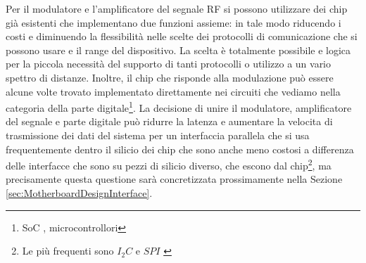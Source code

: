 \documentclass[a4paper, 10pt, final]{article} %
\newcommand{\parenciteit}[2]{\textit{\parencite[#1]{#2}}} %
\begin{document}
    Per il modulatore e l'amplificatore del segnale RF si possono utilizzare dei chip gi\`{a} esistenti che implementano due funzioni assieme: in tale modo riducendo i costi e diminuendo la flessibilit\`{a} nelle scelte dei protocolli di comunicazione che si possono usare e il range del dispositivo.
    La scelta \`{e} totalmente possibile e logica per la piccola necessit\`{a} del supporto di tanti protocolli o utilizzo a un vario spettro di distanze.
    Inoltre, il chip che risponde alla modulazione pu\`{o} essere alcune volte trovato implementato direttamente nei circuiti che vediamo nella categoria della parte digitale\footnote{SoC \parenciteit{}{SoC:Wiki}, microcontrollori}.
    La decisione di unire il modulatore, amplificatore del segnale e parte digitale pu\`{o} ridurre la latenza e aumentare la velocita di trasmissione dei dati del sistema per un interfaccia parallela che si usa frequentemente dentro il silicio dei chip che sono anche meno costosi a differenza delle interfacce che sono su pezzi di silicio diverso, che escono dal chip\footnote{Le pi\`{u} frequenti sono $I_2 C$ \parenciteit{}{I2C:Wiki} e $SPI$ \parenciteit{}{SPI:Wiki}}, ma precisamente questa questione sar\`{a} concretizzata prossimamente nella Sezione \ref{sec:MotherboardDesignInterface}.
\end{document}
